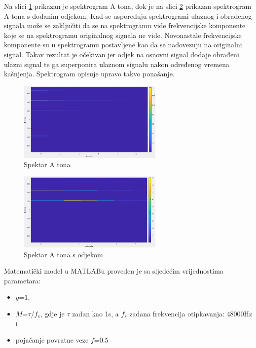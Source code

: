 \documentclass[conference]{IEEEtran}
\begin{document}
Na slici \ref{A_ulaz_spektar} prikazan je spektrogram A tona, dok je na slici \ref{echo} prikazan spektrogram
A tona s dodanim odjekom. Kad se uspoređuju spektrogrami ulaznog i obrađenog signala može se zaključiti da se
na spektrogramu vide frekvencijske komponente koje se na spektrogramu originalnog signala ne vide. Novonastale
frekvencijske komponente su u spektrogramu postavljene kao da se nadovezuju na originalni signal. Takav rezultat je
očekivan jer odjek na osnovni signal dodaje obrađeni ulazni signal te ga superponira ulaznom signalu nakon određenog
vremena kašnjenja. Spektrogram opisuje upravo takvo ponašanje.

\begin{figure}[H]
  \centerline{\includegraphics[width=200pt]{slike/A_ton_ulaz.png}}
  \caption{Spektar A tona}
  \label{A_ulaz_spektar}
\end{figure}

\begin{figure}[H]
  \centerline{\includegraphics[width=200pt]{slike/A_ton_echo.png}}
  \caption{Spektar A tona s odjekom}
  \label{echo}
\end{figure}

Matematički model u MATLABu proveden je sa sljedećim vrijednostima parametara:
\begin{itemize}
  \item{$g$=1,}
  \item{$M$=$\tau$/$f_{s}$, gdje je $\tau$ zadan kao 1s, a $f_{s}$ zadana frekvencija otipkavanja: 48000Hz i}
  \item{pojačanje povratne veze $f$=0.5}
\end{itemize}
\end{document}
